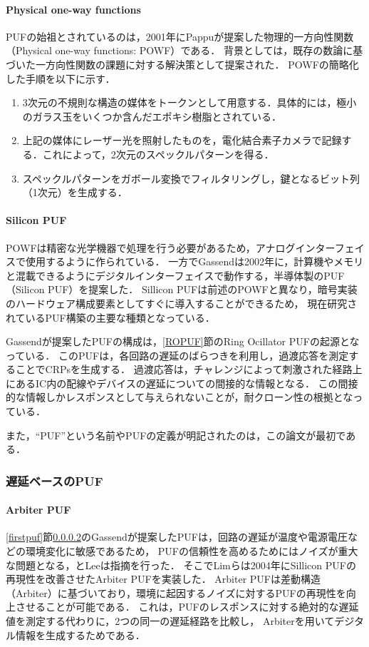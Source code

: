 \documentclass[technicalreport]{ieicej} %
\begin{document}
\paragraph{Physical one-way functions}
PUFの始祖とされているのは，2001年にPappuが提案した物理的一方向性関数（Physical one-way functions: POWF）\cite{pappu}である．
背景としては，既存の数論に基づいた一方向性関数の課題に対する解決策として提案された．
POWFの簡略化した手順を以下に示す．
\begin{enumerate}
  \item 3次元の不規則な構造の媒体をトークンとして用意する．具体的には，極小のガラス玉をいくつか含んだエポキシ樹脂とされている．
  \item 上記の媒体にレーザー光を照射したものを，電化結合素子カメラで記録する．これによって，2次元のスペックルパターンを得る．
  \item スペックルパターンをガボール変換でフィルタリングし，鍵となるビット列（1次元）を生成する．
\end{enumerate}

\paragraph{Silicon PUF}
\label{SiliconPUF}
POWFは精密な光学機器で処理を行う必要があるため，アナログインターフェイスで使用するように作られている．
一方でGassendは2002年に，計算機やメモリと混載できるようにデジタルインターフェイスで動作する，半導体製のPUF（Silicon PUF）を提案した\cite{gassend1}．
Sillicon PUFは前述のPOWFと異なり，暗号実装のハードウェア構成要素としてすぐに導入することができるため，
現在研究されているPUF構築の主要な種類となっている．

Gassendが提案したPUF\cite{gassend1}の構成は，\ref{ROPUF}節のRing Ocillator PUFの起源となっている．
このPUFは，各回路の遅延のばらつきを利用し，過渡応答を測定することでCRPsを生成する．
過渡応答は，チャレンジによって刺激された経路上にあるIC内の配線やデバイスの遅延についての間接的な情報となる．
この間接的な情報しかレスポンスとして与えられないことが，耐クローン性の根拠となっている．

また，“PUF”という名前やPUFの定義が明記されたのは，この論文が最初である．

\subsubsection{遅延ベースのPUF}
\label{delaypuf}
\paragraph{Arbiter PUF}
\label{apuf}
\ref{firstpuf}節\ref{SiliconPUF}のGassendが提案したPUFは，回路の遅延が温度や電源電圧などの環境変化に敏感であるため，
PUFの信頼性を高めるためにはノイズが重大な問題となる，とLeeは指摘を行った\cite{lee}．
そこでLimらは2004年にSillicon PUFの再現性を改善させたArbiter PUF\cite{lim}を実装した．
Arbiter PUFは差動構造（Arbiter）に基づいており，環境に起因するノイズに対するPUFの再現性を向上させることが可能である．
これは，PUFのレスポンスに対する絶対的な遅延値を測定する代わりに，2つの同一の遅延経路を比較し，
Arbiterを用いてデジタル情報を生成するためである．
\end{document}
